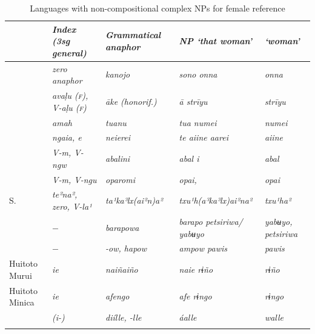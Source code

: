 \documentclass[output=collectionpaper]{langsci/langscibook}
\begin{document}
\begin{table}
\begin{tabularx}{\textwidth}{Q>{\itshape}Q>{\itshape}Q>{\itshape}Q>{\itshape}Q}
\lsptoprule
& \normalfont	Index (3sg general)	&	\normalfont Grammatical anaphor	&	\normalfont NP ‘that woman’	&	\normalfont ‘woman’	\\
\midrule
{}	&	\normalfont zero anaphor	&	kanojo	&	sono onna	&	onna	\\
	&	avaḷu {\normalfont (\scshape f)}, {\normalfont V}-aḷu {\normalfont (\scshape f)}	&	āke \normalfont (honorif.)	&	ā strīyu	&	strīyu	\\
	&	amah	&	tuanu	&	tua numei	&	numei	\\
	&	ngaia, e	&	neierei	&	te aiine aarei	&	aiine	\\
	&	{\normalfont V}-m, {\normalfont V}-ngw	&	abalini	&	abal i	&	abal	\\
	&	{\normalfont V}-m, {\normalfont V}-ngu	&	oparomi	&	opai, 	&	opai	\\
S.~	&	te²na², {\normalfont zero}, {\normalfont V}-la¹	&	ta¹ka³lx(ai²n)a²	&	txu¹h(a³ka³lx)ai²na²	&	txu¹ha²	\\
	&	$-$	&	barapowa	&	barapo petsiriwa/ yabʉyo	&	yabʉyo, petsiriwa	\\
	&	$-$ 	&	-ow, hapow	&	ampow pawis	&	pawis	\\
Huitoto Murui	&	ie	&	naiñaiño	&	naie rɨño	&	rɨño	\\
Huitoto Minica	&	ie	&	afengo	&	afe rɨngo	&	rɨngo	\\
	&	(i-)	&	diílle, -lle	&	áalle	&	walle	\\
\lspbottomrule
\end{tabularx}
\caption{Languages with non-compositional complex NPs for female reference}
\label{tab:BW:8}
\end{table}
\end{document}
